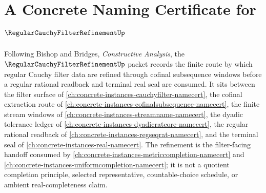 \chapter{A Concrete Naming Certificate for $\RegularCauchyFilterRefinementUp$}
\label{ch:concrete-instances-regular-cauchy-filter-refinement-namecert}

Following Bishop and Bridges, \emph{Constructive Analysis}, the $\RegularCauchyFilterRefinementUp$ packet records the finite route by which regular Cauchy filter data are refined through cofinal subsequence windows before a regular rational readback and terminal real seal are consumed. It sits between the filter surface of \autoref{ch:concrete-instances-cauchyfilter-namecert}, the cofinal extraction route of \autoref{ch:concrete-instances-cofinalsubsequence-namecert}, the finite stream windows of \autoref{ch:concrete-instances-streamname-namecert}, the dyadic tolerance ledger of \autoref{ch:concrete-instances-dyadicratcore-namecert}, the regular rational readback of \autoref{ch:concrete-instances-regseqrat-namecert}, and the terminal seal of \autoref{ch:concrete-instances-real-namecert}. The refinement is the filter-facing handoff consumed by \autoref{ch:concrete-instances-metriccompletion-namecert} and \autoref{ch:concrete-instances-uniformcompletion-namecert}; it is not a quotient completion principle, selected representative, countable-choice schedule, or ambient real-completeness claim.

